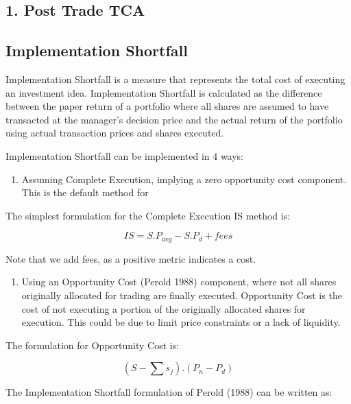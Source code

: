 \hypertarget{post-trade-tca}{%
\subsection{1. Post Trade TCA}\label{post-trade-tca}}

\hypertarget{implementation-shortfall}{%
\subsection{Implementation Shortfall}\label{implementation-shortfall}}

Implementation Shortfall is a measure that represents the total cost of
executing an investment idea. Implementation Shortfall is calculated as
the difference between the paper return of a portfolio where all shares
are assumed to have transacted at the manager's decision price and the
actual return of the portfolio using actual transaction prices and
shares executed.

Implementation Shortfall can be implemented in 4 ways:

\begin{enumerate}
\def\labelenumi{\arabic{enumi}.}
\tightlist
\item
  Assuming Complete Execution, implying a zero opportunity cost
  component. This is the default method for
\end{enumerate}

The simplest formulation for the Complete Execution IS method is:

\[ IS = S . P_{avg} - S . P_{d} + fees \]

Note that we add fees, as a positive metric indicates a cost.

\begin{enumerate}
\def\labelenumi{\arabic{enumi}.}
\setcounter{enumi}{1}
\tightlist
\item
  Using an Opportunity Cost (Perold 1988) component, where not all
  shares originally allocated for trading are finally executed.
  Opportunity Cost is the cost of not executing a portion of the
  originally allocated shares  for execution. This could be due
  to limit price constraints or a lack of liquidity.
\end{enumerate}

The formulation for Opportunity Cost is:

\[ {(S - \sum s_{j}) . (P_{n} - P_{d})} \]

The Implementation Shortfall formulation of Perold (1988) can be written
as:

